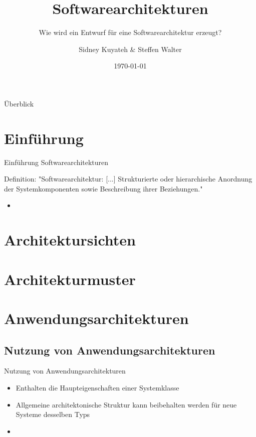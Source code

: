 \documentclass{beamer}
\title{Softwarearchitekturen}
\subtitle{Wie wird ein Entwurf für eine Softwarearchitektur erzeugt?}
\author{Sidney Kuyateh \& Steffen Walter}
\institute{Duale Hochschule Baden-Württemberg}
\date{\today}
\begin{document}
	\maketitle
	\begin{frame}{Überblick}
		\tableofcontents
	\end{frame}
		\section{Einführung}
		\begin{frame}{Einführung Softwarearchitekturen}
			\begin{block}{Definition:}
				"Softwarearchitektur: [...] Strukturierte oder hierarchische Anordnung der Systemkomponenten sowie Beschreibung ihrer Beziehungen."\cite[ S. 520]{balzert}
			\end{block}
		\begin{itemize}
			\item 
		\end{itemize}
		
		\end{frame}
		
		\section{Architektursichten}
		\section{Architekturmuster}
	
	\section{Anwendungsarchitekturen}
		\subsection{Nutzung von Anwendungsarchitekturen}
			\begin{frame}{Nutzung von Anwendungsarchitekturen}
				\begin{itemize} %
					\item Enthalten die Haupteigenschaften einer Systemklasse
					\item Allgemeine architektonische Struktur kann beibehalten werden für neue Systeme desselben Typs
					\item
				\end{itemize}
			\end{frame}
\end{document}
